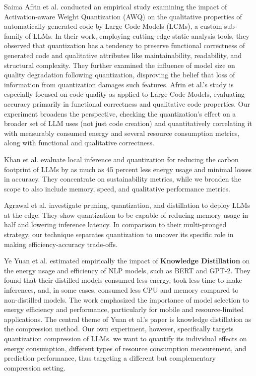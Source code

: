 Saima Afrin et al. \cite{DBLP:journals/corr/abs-2507-09665} conducted an empirical study examining the impact of Activation-aware Weight Quantization (AWQ) on the qualitative properties of automatically generated code by Large Code Models (LCMs), a custom sub-family of LLMs. In their work, employing cutting-edge static analysis tools, they observed that quantization has a tendency to preserve functional correctness of generated code and qualitative attributes like maintainability, readability, and structural complexity. They further examined the influence of model size on quality degradation following quantization, disproving the belief that loss of information from quantization damages such features. Afrin et al.'s study is especially focused on code quality as applied to Large Code Models, evaluating accuracy primarily in functional correctness and qualitative code properties. Our experiment broadens the perspective, checking the quantization's effect on a broader set of LLM uses (not just code creation) and quantitatively correlating it with measurably consumed energy and several resource consumption metrics, along with functional and qualitative correctness.

Khan et al. \cite{DBLP:journals/corr/abs-2504-06307} evaluate local inference and quantization for reducing the carbon footprint of LLMs by as much as 45 percent less energy usage and minimal losses in accuracy. They concentrate on sustainability metrics, while we broaden the scope to also include memory, speed, and qualitative performance metrics.

Agrawal et al. \cite{10968787} investigate pruning, quantization, and distillation to deploy LLMs at the edge. They show quantization to be capable of reducing memory usage in half and lowering inference latency. In comparison to their multi-pronged strategy, our technique separates quantization to uncover its specific role in making efficiency-accuracy trade-offs.

Ye Yuan et al. \cite{DBLP:conf/cain/YuanSZCZSM24} estimated empirically the impact of \textbf{Knowledge Distillation} on the energy usage and efficiency of NLP models, such as BERT and GPT-2. They found that their distilled models consumed less energy, took less time to make inferences, and, in some cases, consumed less CPU and memory compared to non-distilled models. The work emphasized the importance of model selection to energy efficiency and performance, particularly for mobile and resource-limited applications. The central theme of Yuan et al.'s paper \cite{DBLP:conf/cain/YuanSZCZSM24} is knowledge distillation as the compression method. Our own experiment, however, specifically targets quantization compression of LLMs. we want to quantify its individual effects on energy consumption, different types of resource consumption measurement, and prediction performance, thus targeting a different but complementary compression setting.

